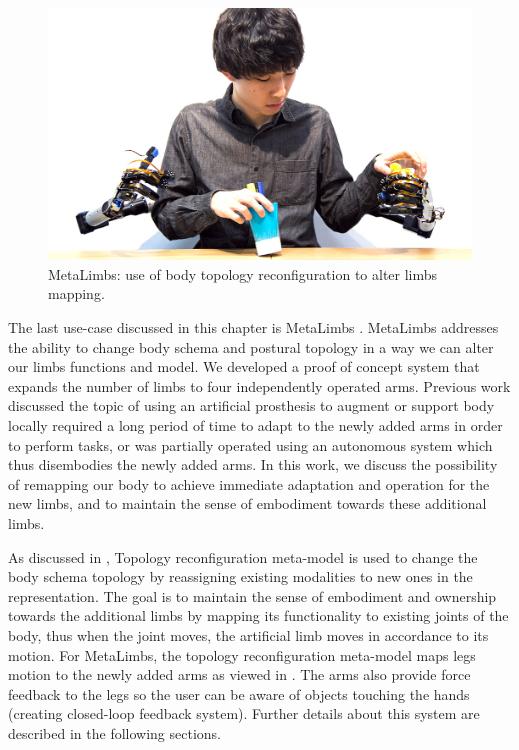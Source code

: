 \begin{figure}[h!]
  \centering
	  \includegraphics[width=1\linewidth]{figures/eval/MetaLimbs/MetaLimbs_Adaptation.jpg}
  \captionsetup{justification=centering}
  \caption{MetaLimbs: use of body topology reconfiguration to alter limbs mapping.}
  \label{fig:eval-metalimbs-overview}
\end{figure}

The last use-case discussed in this chapter is MetaLimbs . MetaLimbs addresses the ability to change body schema and postural topology in a way we can alter our limbs functions and model. We developed a proof of concept system that expands the number of limbs to four independently operated arms. Previous work discussed the topic of using an artificial prosthesis to augment or support body locally \cite{stelarc1980thirdhand,parietti2014bracing} required a long period of time to adapt to the newly added arms in order to perform tasks, or was partially operated using an autonomous system which thus disembodies the newly added arms. In this work, we discuss the possibility of remapping our body to achieve immediate adaptation and operation for the new limbs, and to maintain the sense of embodiment towards these additional limbs. 

As discussed in , Topology reconfiguration meta-model is used to change the body schema topology by reassigning existing modalities to new ones in the representation. The goal is to maintain the sense of embodiment and ownership towards the additional limbs by mapping its functionality to existing joints of the body, thus when the joint moves, the artificial limb moves in accordance to its motion. For MetaLimbs, the topology reconfiguration meta-model maps legs motion to the newly added arms as viewed in . The arms also provide force feedback to the legs so the user can be aware of objects touching the hands (creating closed-loop feedback system). Further details about this system are described in the following sections.

